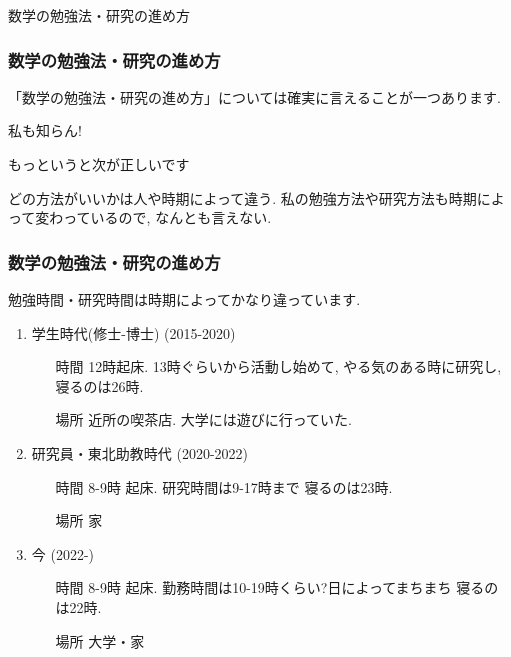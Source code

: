 \documentclass[11pt,dvipdfmx]{beamer}
\theoremstyle{definition}
\theoremstyle{remark}
\begin{document}
\begin{frame}  
 \begin{center}
 数学の勉強法・研究の進め方
 \end{center}
 
\end{frame}



\begin{frame} 
 \frametitle{数学の勉強法・研究の進め方}
 
 「数学の勉強法・研究の進め方」については確実に言えることが一つあります. 
 
 \pause
 \begin{block}{}
  \begin{center}
 私も知らん!
  \end{center}
  \end{block}
  
もっというと次が正しいです
\pause
 \begin{block}{}
  \begin{center}
どの方法がいいかは人や時期によって違う. 私の勉強方法や研究方法も時期によって変わっているので, なんとも言えない.
 \end{center}
   \end{block}
\end{frame}




\begin{frame} 
 \frametitle{数学の勉強法・研究の進め方}
 勉強時間・研究時間は時期によってかなり違っています. 
     \begin{enumerate}
     \item 学生時代(修士-博士) (2015-2020)
     		\begin{itemize}
     		\item[時間]12時起床. 13時ぐらいから活動し始めて, やる気のある時に研究し, 寝るのは26時.
     		\item[場所] 近所の喫茶店. 大学には遊びに行っていた.
     		\end{itemize}
     \item 研究員・東北助教時代 (2020-2022) 
     		\begin{itemize}
     		\item[時間] 8-9時 起床. 研究時間は9-17時まで 寝るのは23時.
     		\item[場所] 家
     		\end{itemize}
       \item 今 (2022-) 
     		\begin{itemize}
     		\item[時間] 8-9時 起床. 勤務時間は10-19時くらい?日によってまちまち 寝るのは22時.
     		\item[場所] 大学・家
     		\end{itemize}
     \end{enumerate}
\end{frame}
\end{document}
